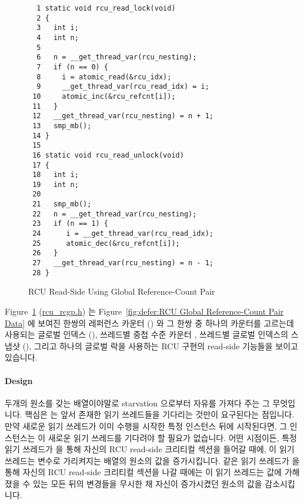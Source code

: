 \begin{figure}[tbp]
{ \scriptsize
\begin{verbatim}
  1 static void rcu_read_lock(void)
  2 {
  3   int i;
  4   int n;
  5
  6   n = __get_thread_var(rcu_nesting);
  7   if (n == 0) {
  8     i = atomic_read(&rcu_idx);
  9     __get_thread_var(rcu_read_idx) = i;
 10     atomic_inc(&rcu_refcnt[i]);
 11   }
 12   __get_thread_var(rcu_nesting) = n + 1;
 13   smp_mb();
 14 }
 15
 16 static void rcu_read_unlock(void)
 17 {
 18   int i;
 19   int n;
 20
 21   smp_mb();
 22   n = __get_thread_var(rcu_nesting);
 23   if (n == 1) {
 24      i = __get_thread_var(rcu_read_idx);
 25      atomic_dec(&rcu_refcnt[i]);
 26   }
 27   __get_thread_var(rcu_nesting) = n - 1;
 28 }
\end{verbatim}
}
\caption{RCU Read-Side Using Global Reference-Count Pair}
\label{fig:defer:RCU Read-Side Using Global Reference-Count Pair}
\end{figure}

Figure~\ref{fig:defer:RCU Read-Side Using Global Reference-Count Pair}
(\url{rcu_rcgp.h})
는
Figure~\ref{fig:defer:RCU Global Reference-Count Pair Data} 에 보여진
한쌍의 레퍼런스 카운터 () 와 그 한쌍 중 하나의 카운터를
고르는데 사용되는 글로벌 인덱스 (), 쓰레드별 중첩 수준 카운터
, 쓰레드별 글로벌 인덱스의 스냅샷 (), 그리고
하나의 글로벌 락을 사용하는 RCU 구현의 read-side 기능들을 보이고 있습니다.
\iffalse

Figure~\ref{fig:defer:RCU Read-Side Using Global Reference-Count Pair}
(\url{rcu_rcgp.h})
shows the read-side primitives of an RCU implementation that uses a pair
of reference counters (\co{rcu_refcnt[]}),
along with a global index that
selects one counter out of the pair (\co{rcu_idx}),
a per-thread nesting counter \co{rcu_nesting},
a per-thread snapshot of the global index (\co{rcu_read_idx}),
and a global lock (\co{rcu_gp_lock}),
which are themselves shown in
Figure~\ref{fig:defer:RCU Global Reference-Count Pair Data}.
\fi

\paragraph{Design}

두개의 원소를 갖는  배열이야말로 starvation 으로부터 자유를
가져다 주는 그 무엇입니다.
핵심은  는 앞서 존재한 읽기 쓰레드들을 기다리는 것만이
요구된다는 점입니다.
만약 새로운 읽기 쓰레드가 이미 수행을 시작한 특정 
인스턴스 뒤에 시작된다면, 그  인스턴스는 이 새로운 읽기
쓰레드를 기다려야 할 필요가 없습니다.
어떤 시점이든, 특정 읽기 쓰레드가  을 통해 자신의 RCU
read-side 크리티컬 섹션을 들어갈 때에, 이 읽기 쓰레드는  변수로
가리켜지는  배열의 원소의 값을 증가시킵니다.
같은 읽기 쓰레드가  을 통해 자신의 RCU read-side 크리티컬
섹션을 나갈 때에는  이 읽기 쓰레드는  값에 가해졌을 수 있는 모든
뒤의 변경들을 무시한 채 자신이 증가시켰던 원소의 값을 감소시킵니다.
\iffalse

